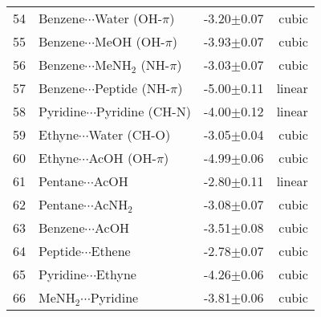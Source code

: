 \begin{longtable}{llrr}
54 & Benzene$\cdots$Water (OH-$\pi$) & -3.20$\pm$0.07 & cubic \\
55 & Benzene$\cdots$MeOH (OH-$\pi$) & -3.93$\pm$0.07 & cubic \\
56 & Benzene$\cdots$MeNH$_2$ (NH-$\pi$) & -3.03$\pm$0.07 & cubic \\
57 & Benzene$\cdots$Peptide (NH-$\pi$) & -5.00$\pm$0.11 & linear \\
58 & Pyridine$\cdots$Pyridine (CH-N) & -4.00$\pm$0.12 & linear \\
59 & Ethyne$\cdots$Water (CH-O) & -3.05$\pm$0.04 & cubic \\
60 & Ethyne$\cdots$AcOH (OH-$\pi$) & -4.99$\pm$0.06 & cubic \\
61 & Pentane$\cdots$AcOH & -2.80$\pm$0.11 & linear \\
62 & Pentane$\cdots$AcNH$_2$ & -3.08$\pm$0.07 & cubic \\
63 & Benzene$\cdots$AcOH & -3.51$\pm$0.08 & cubic \\
64 & Peptide$\cdots$Ethene & -2.78$\pm$0.07 & cubic \\
65 & Pyridine$\cdots$Ethyne & -4.26$\pm$0.06 & cubic \\
66 & MeNH$_2$$\cdots$Pyridine & -3.81$\pm$0.06 & cubic \\
\end{longtable}